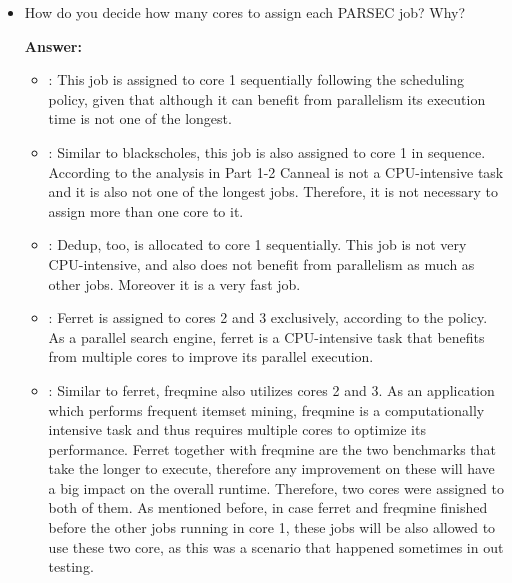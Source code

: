 \begin{enumerate}
\begin{itemize}
     Conversely, when the CPU utilization is relatively low (combined utilization of both cores less than 130\%), it is more efficient to limit memcached to a single core, freeing up resources for other processes or jobs that might require them, reducing the overall time of execution of the PARSEC jobs. This dynamic and responsive approach ensures a balanced, efficient use of system resources. 

    \item How do you decide how many cores to assign each PARSEC job? Why?

     \textbf{Answer:}

     \begin{itemize}
        \item {}: This job is assigned to core 1 sequentially following the scheduling policy, given that although it can benefit from parallelism its execution time is not one of the longest.
        
        \item {}: Similar to blackscholes, this job is also assigned to core 1 in sequence. According to the analysis in Part 1-2 Canneal is not a CPU-intensive task and it is also not one of the longest jobs. Therefore, it is not necessary to assign more than one core to it.
        
        \item {}: Dedup, too, is allocated to core 1 sequentially. This job is not very CPU-intensive, and also does not benefit from parallelism as much as other jobs. Moreover it is a very fast job.
    
        \item {}: Ferret is assigned to cores 2 and 3 exclusively, according to the policy. As a parallel search engine, ferret is a CPU-intensive task that benefits from multiple cores to improve its parallel execution. 
        
        \item {}: Similar to ferret, freqmine also utilizes cores 2 and 3. As an application which performs frequent itemset mining, freqmine is a computationally intensive task and thus requires multiple cores to optimize its performance. Ferret together with freqmine are the two benchmarks that take the longer to execute, therefore any improvement on these will have a big impact on the overall runtime. Therefore, two cores were assigned to both of them.
        As mentioned before, in case ferret and freqmine finished before the other jobs running in core 1, these jobs will be also allowed to use these two core, as this was a scenario that happened sometimes in out testing.


\end{itemize}
\end{itemize}
\end{enumerate}
